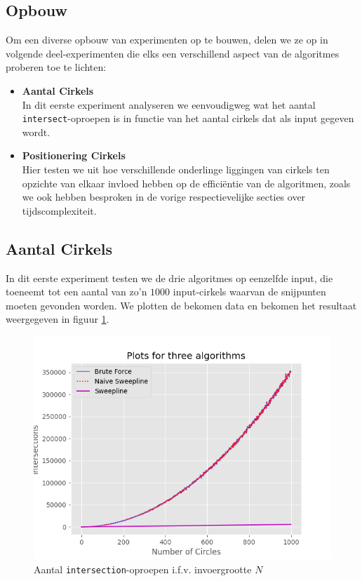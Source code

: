 \documentclass[12pt]{article}
\begin{document}
\subsection{Opbouw}
Om een diverse opbouw van experimenten op te bouwen, delen we ze op in volgende deel-experimenten die elks een verschillend aspect van de algoritmes proberen toe te lichten:
\begin{itemize}
	\item \textbf{Aantal Cirkels}\\
	In dit eerste experiment analyseren we eenvoudigweg wat het aantal \texttt{intersect}-oproepen is in functie van het aantal cirkels dat als input gegeven wordt. 
	\item \textbf{Positionering Cirkels}\\
	Hier testen we uit hoe verschillende onderlinge liggingen van cirkels ten opzichte van elkaar invloed hebben op de efficiëntie van de algoritmen, zoals we ook hebben besproken in de vorige respectievelijke secties over tijdscomplexiteit.
	
\end{itemize}

\subsection{Aantal Cirkels}\label{sec:aantalCirkels}
In dit eerste experiment testen we de drie algoritmes op eenzelfde input, die toeneemt tot een aantal van zo'n $1000$ input-cirkels waarvan de snijpunten moeten gevonden worden. We plotten de bekomen data en bekomen het resultaat weergegeven in figuur \ref{fig:IntersectionsIfvN}. 

\begin{figure}
	\centering
	\includegraphics[width=\linewidth]{../plots/ThreeAlgorithmsVisualised.png}
	\caption{Aantal \texttt{intersection}-oproepen i.f.v. invoergrootte $N$}
	\label{fig:IntersectionsIfvN}
\end{figure}
\end{document}
